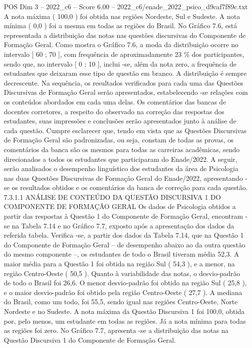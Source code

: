 \begin{textsample}{POS Dim 3 – 2022\_c6 – Score 6.00 – 2022\_c6/enade\_2022\_psico\_d9caf7f89c.txt}
A nota máxima ( 100,0 ) foi obtida nas regiões Nordeste, Sul e Sudeste.
A nota mínima ( 0,0 ) foi a mesma em todas as regiões do Brasil.
No Gráfico 7.6, está representada a distribuição das notas nas questões discursivas do Componente de Formação Geral.
Como mostra o Gráfico 7.6, a moda da distribuição ocorre no intervalo [ 60 ; 70 ], com frequência de aproximadamente 23 \% dos participantes, sendo que, no intervalo [ 0 ; 10 ], inclui -se, além da nota zero, a frequência de estudantes que deixaram esse tipo de questão em branco.
A distribuição é sempre decrescente.
Na sequência, os resultados verificados para cada uma das Questões Discursivas de Formação Geral serão apresentados, estabelecendo -se relações com os conteúdos abordados em cada uma delas.
Os comentários das bancas de docentes corretores, a respeito do observado na correção das respostas dos estudantes, suas impressões e conclusões serão apresentados junto à análise de cada questão.
Cumpre esclarecer que, tendo em vista que as Questões Discursivas de Formação Geral são padronizadas, ou seja, constam de todas as provas, os comentários da banca são os mesmos para todas as carreiras acadêmicas, sendo direcionados a todos os estudantes que participaram do Enade/2022.
A seguir, serão analisados o desempenho linguístico dos estudantes da área de Psicologia nas duas Questões Discursivas de Formação Geral do Enade/2022, apresentando -se os resultados obtidos e os comentários da banca de correção para cada questão. 7.3.1.1 ANÁLISE DE CONTEÚDO DA QUESTÃO DISCURSIVA 1 DO COMPONENTE DE FORMAÇÃO GERAL Os dados de Psicologia obtidos a partir das respostas à Questão 1 do Componente de Formação Geral, encontram -se na Tabela 7.14 e no Gráfico 7.7, exposto após a apresentação dos dados da referida tabela.
Verifica -se, a partir dos dados da Tabela 7.14, que na Questão 1 do Componente de Formação Geral – de desempenho abaixo ao da outra questão do mesmo componente –, os estudantes de todo o Brasil tiveram média 52,3.
A maior média para a Questão 1 foi obtida na região Sul ( 54,3 ), e a menor, na região Centro-Oeste ( 50,5 ).
Quanto à variabilidade das notas, o desvio-padrão de todo o Brasil foi 26,6.
O menor desvio-padrão foi obtido na região Sul ( 25,8 ), e o maior desvio-padrão foi obtido pela região Centro-Oeste ( 27,7 ).
A mediana do Brasil, como um todo, foi 55,5, sendo igual nas regiões Centro-Oeste, Norte Nordeste e no Sudeste.
A nota máxima da Questão Discursiva 1 foi 100,0, obtida por, pelo menos, um estudante em todas as regiões.
Já a nota mínima para todas as regiões foi zero.
No Gráfico 7.7, apresenta -se a distribuição das notas na Questão Discursiva 1 do Componente de Formação Geral.

\end{textsample}
